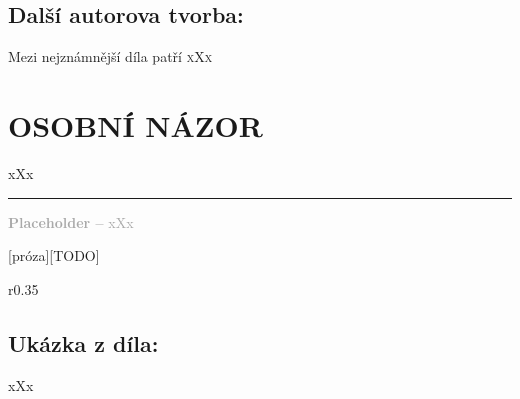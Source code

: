 \documentclass{extarticle} %
\begin{document}

\subsection*{Další autorova tvorba:}
\noindent 
Mezi nejznámnější díla patří \textsc{xXx}






\section*{OSOBNÍ NÁZOR}
\noindent 
xXx

\vfill

\noindent\begin{minipage}{\textwidth}
    \textcolor{darkgray}{\rule{\linewidth}{0.4pt}
    \footnotesize
    \textbf{Placeholder --} xXx
    }
\end{minipage}

\newpage


\changefontsize{8pt}

[próza][TODO]

\noindent\begin{wrapfigure}{r}{0.35\textwidth}
\tiny

\subsection*{Ukázka z díla:}
\setlength{\parindent}{3pt}
xXx
\end{wrapfigure}
\end{document}
